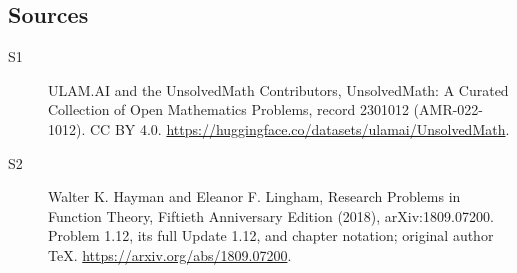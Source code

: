 \documentclass[11pt]{article}
\begin{document}
\subsection{Sources}
\begin{description}
\item[\hypertarget{source:2301012:1}{S1}] ULAM.AI and the UnsolvedMath Contributors, UnsolvedMath: A Curated Collection of Open Mathematics Problems, record 2301012 (AMR-022-1012). CC BY 4.0. \url{https://huggingface.co/datasets/ulamai/UnsolvedMath}.
\item[\hypertarget{source:2301012:2}{S2}] Walter K. Hayman and Eleanor F. Lingham, Research Problems in Function Theory, Fiftieth Anniversary Edition (2018), arXiv:1809.07200. Problem 1.12, its full Update 1.12, and chapter notation; original author TeX. \url{https://arxiv.org/abs/1809.07200}.
\end{description}
\label{end:2301012}
\end{document}
